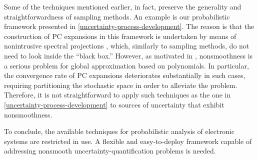 Some of the techniques mentioned earlier, in fact, preserve the generality and
straightforwardness of sampling methods. An example is our probabilistic
framework presented in \cref{uncertainty-process-development}. The reason is
that the construction of \ac{PC} expansions in this framework is undertaken by
means of nonintrusive spectral projections \cite{xiu2010}, which, similarly to
sampling methods, do not need to look inside the ``black box.'' However, as
motivated in , nonsmoothness is a serious problem for
global approximation based on polynomials. In particular, the convergence rate
of \ac{PC} expansions deteriorates substantially in such cases, requiring
partitioning the stochastic space in order to alleviate the problem. Therefore,
it is not straightforward to apply such techniques as the one in
\cref{uncertainty-process-development} to sources of uncertainty that exhibit
nonsmoothness.

To conclude, the available techniques for probabilistic analysis of electronic
systems are restricted in use. A flexible and easy-to-deploy framework capable
of addressing nonsmooth uncertainty-quantification problems is needed.
